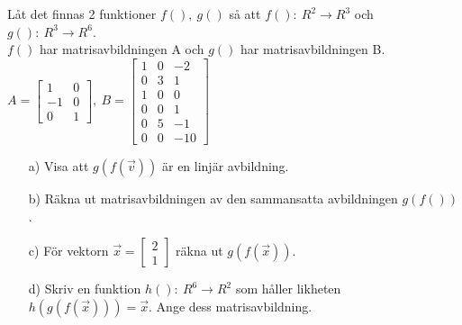 Låt det finnas 2 funktioner $f(),\ g()$ så att $f():\ R^2\to R^3$ och $g():\ R^3\to R^6$. \\
$f()$ har matrisavbildningen A och $g()$ har matrisavbildningen B.\\
$A=\begin{bmatrix}1 & 0\\-1 & 0\\0&1 \end{bmatrix},\ B=\begin{bmatrix}1 & 0 & -2\\0 &3 & 1\\1&0&0\\0&0&1\\0&5&-1\\0&0&-10\end{bmatrix}$\\
\begin{itemize}
	\item[a) ] Visa att $g(f(\vec{v}))$ är en linjär avbildning.
	\item[b) ] Räkna ut matrisavbildningen av den sammansatta avbildningen $g(f())$.
	\item[c) ] För vektorn $\vec{x}=\begin{bmatrix}2\\1\end{bmatrix}$ räkna ut $g(f(\vec{x}))$.
	\item[d) ] Skriv en funktion $h():\ R^6\to R^2$ som håller likheten $h(g(f(\vec{x})))=\vec{x}$. Ange dess matrisavbildning.
\end{itemize}
